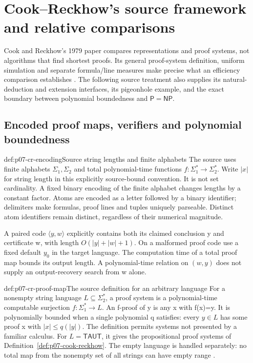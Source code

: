 \section{Cook--Reckhow's source framework and relative comparisons}
\label{sec:p07-cook-reckhow-source}

Cook and Reckhow's 1979 paper compares representations and proof systems,
not algorithms that find shortest proofs. Its general proof-system
definition, uniform simulation and separate formula/line measures make
precise what an efficiency comparison establishes
\cite[\S\S1--5]{CookReckhow1979}. The following source treatment also
supplies its natural-deduction and extension interfaces, its pigeonhole
example, and the exact boundary between polynomial boundedness and
\(\mathsf P=\mathsf{NP}\).

\subsection{Encoded proof maps, verifiers and polynomial boundedness}

\begin{hbconvention}{def:p07-cr-encoding}{Source string lengths and finite alphabets}
The source uses finite alphabets \(\Sigma_1,\Sigma_2\) and total
polynomial-time functions \(f:\Sigma_1^*\to\Sigma_2^*\).
Write \(|x|\) for string length in this explicitly source-bound
convention. It is not set cardinality. A fixed binary encoding of the
finite alphabet changes lengths by a constant factor. Atoms are encoded
as a letter followed by a binary identifier; delimiters make formulas,
proof lines and tuples uniquely parseable. Distinct atom identifiers
remain distinct, regardless of their numerical magnitude.

A paired code \(\langle y,w\rangle\) explicitly contains both its
claimed conclusion y and certificate w, with length
\(O(|y|+|w|+1)\). On a malformed proof code use a fixed default
\(y_0\) in the target language. The computation time of a total
proof map bounds its output length. A polynomial-time relation on
\((w,y)\) does not supply an output-recovery search from w alone.
\end{hbconvention}

\begin{hbdefinition}{def:p07-cr-proof-map}{The source definition for an arbitrary language}
For a nonempty string language \(L\subseteq\Sigma_2^*\), a proof
system is a polynomial-time computable surjection
\(f:\Sigma_1^*\to L\). An f-proof of y is any x with f(x)=y.
It is polynomially bounded when a single polynomial q satisfies:
every \(y\in L\) has some proof x with \(|x|\leq q(|y|)\).
The definition permits systems not presented by a familiar calculus.
For \(L=\mathsf{TAUT}\), it gives the propositional proof systems
of Definition~\ref{def:p07-cook-reckhow}.
The empty language is handled separately: no total map from the nonempty
set of all strings can have empty range
\cite[defs.~1.2--1.3, prop.~1.4]{CookReckhow1979}.
\end{hbdefinition}

